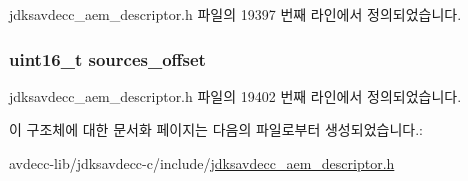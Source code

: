 jdksavdecc\+\_\+aem\+\_\+descriptor.\+h 파일의 19397 번째 라인에서 정의되었습니다.

\subsubsection[{\texorpdfstring{sources\+\_\+offset}{sources_offset}}]{\setlength{\rightskip}{0pt plus 5cm}uint16\+\_\+t sources\+\_\+offset}\hypertarget{structjdksavdecc__descriptor__signal__selector_ac9ce4e1b642e6654d49504898dbe738d}{}\label{structjdksavdecc__descriptor__signal__selector_ac9ce4e1b642e6654d49504898dbe738d}


jdksavdecc\+\_\+aem\+\_\+descriptor.\+h 파일의 19402 번째 라인에서 정의되었습니다.



이 구조체에 대한 문서화 페이지는 다음의 파일로부터 생성되었습니다.\+:\begin{DoxyCompactItemize}
\item 
avdecc-\/lib/jdksavdecc-\/c/include/\hyperlink{jdksavdecc__aem__descriptor_8h}{jdksavdecc\+\_\+aem\+\_\+descriptor.\+h}\end{DoxyCompactItemize}
